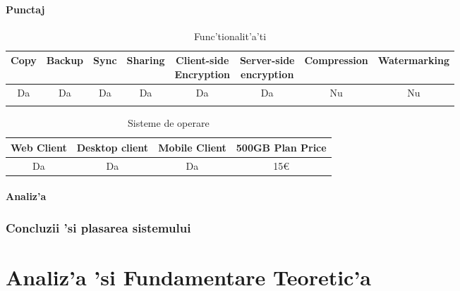 \documentclass[12pt,a4paper,twoside]{report}
\newcommand{\greencheck}{\color{green}  \ding{51}}
\newcommand{\redxmark}{\color{red} \ding{55}}
\begin{document}
\subsubsection{Punctaj}
\begin{table}[H]
\centering
\caption{Func'tionalit'a'ti}
\begin{tabular}{|c|c|c|c|c|c|c|c|}          
\hline               
Copy & Backup & Sync & Sharing & \makecell{Client-side\\ Encryption} & \makecell{Server-side \\ encryption} & Compression & Watermarking \\ [0.5ex]   
\hline 
Da & Da & Da & Da & Da & Da & Nu & Nu    \\                      
\greencheck & \greencheck\greencheck & \greencheck & \greencheck & \greencheck\greencheck & \greencheck\greencheck &  \redxmark\redxmark &  \redxmark\redxmark  \\               
\hline                              
\end{tabular}
\label{table:syncfeaturetable}             
\end{table}
\begin{table}[H]
\centering
\caption{Sisteme de operare}
\begin{tabular}{|c|c|c|c|}          
\hline                      
 Web Client & Desktop client & Mobile Client & 500GB Plan Price\\ [0.5ex]   
\hline                            
Da & Da & Da & 15\euro \\               
\hline                              
\end{tabular}
\label{table:syncsystemtable}             
\end{table}
\subsubsection{Analiz'a}

\subsection{Concluzii 'si plasarea sistemului}


\chapter{Analiz'a 'si Fundamentare Teoretic'a}
\label{ch:analysis}
\end{document}
